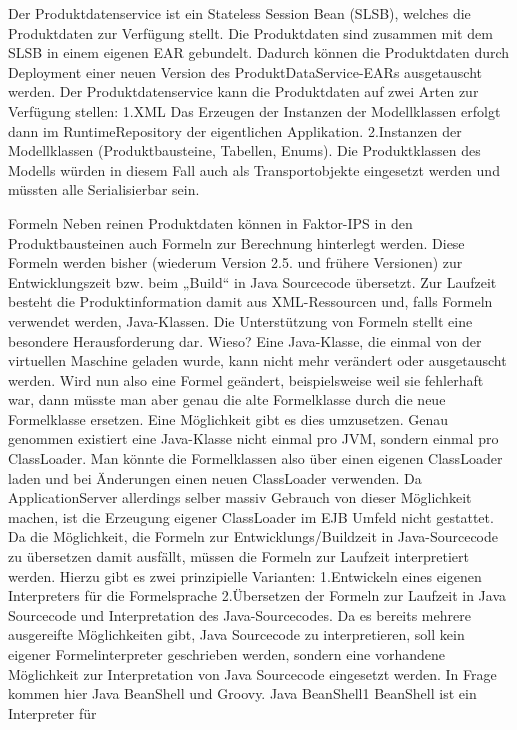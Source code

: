 \documentclass[headsepline=true, footsepline=true]{scrartcl}
\begin{document}
Der Produktdatenservice ist ein Stateless
Session Bean (SLSB), welches die Produktdaten zur Verfügung stellt. Die
Produktdaten sind zusammen mit dem SLSB in einem eigenen EAR gebundelt. Dadurch
können die Produktdaten durch Deployment einer neuen Version des
ProduktDataService-EARs ausgetauscht werden. Der Produktdatenservice kann die
Produktdaten auf zwei Arten zur Verfügung stellen: 1.XML Das Erzeugen der
Instanzen der Modellklassen erfolgt dann im RuntimeRepository der eigentlichen
Applikation. 2.Instanzen der Modellklassen (Produktbausteine, Tabellen, Enums).
Die Produktklassen des Modells würden in diesem Fall auch als Transportobjekte
eingesetzt werden und müssten alle Serialisierbar sein.

Formeln Neben reinen Produktdaten können in Faktor-IPS in den Produktbausteinen
auch Formeln zur Berechnung hinterlegt werden. Diese Formeln werden bisher
(wiederum Version 2.5. und frühere Versionen) zur Entwicklungszeit bzw. beim
„Build“ in Java Sourcecode übersetzt. Zur Laufzeit besteht die Produktinformation
damit aus XML-Ressourcen und, falls Formeln verwendet werden, Java-Klassen. Die
Unterstützung von Formeln stellt eine besondere Herausforderung dar. Wieso? Eine
Java-Klasse, die einmal von der virtuellen Maschine geladen wurde, kann nicht
mehr verändert oder ausgetauscht werden. Wird nun also eine Formel geändert,
beispielsweise weil sie fehlerhaft war, dann müsste man aber genau die alte
Formelklasse durch die neue Formelklasse ersetzen. Eine Möglichkeit gibt es dies
umzusetzen. Genau genommen existiert eine Java-Klasse nicht einmal pro JVM,
sondern einmal pro ClassLoader. Man könnte die Formelklassen also über einen
eigenen ClassLoader laden und bei Änderungen einen neuen ClassLoader verwenden.
Da ApplicationServer allerdings selber massiv Gebrauch von dieser Möglichkeit
machen, ist die Erzeugung eigener ClassLoader im EJB Umfeld nicht gestattet. Da
die Möglichkeit, die Formeln zur Entwicklungs/Buildzeit in Java-Sourcecode zu
übersetzen damit ausfällt, müssen die Formeln zur Laufzeit interpretiert werden.
Hierzu gibt es zwei prinzipielle Varianten: 1.Entwickeln eines eigenen
Interpreters für die Formelsprache 2.Übersetzen der Formeln zur Laufzeit in Java
Sourcecode und Interpretation des Java-Sourcecodes. Da es bereits mehrere
ausgereifte Möglichkeiten gibt, Java Sourcecode zu interpretieren, soll kein
eigener Formelinterpreter geschrieben werden, sondern eine vorhandene Möglichkeit
zur Interpretation von Java Sourcecode eingesetzt werden. In Frage kommen hier
Java BeanShell und Groovy. Java BeanShell1 BeanShell ist ein Interpreter für
\end{document}
